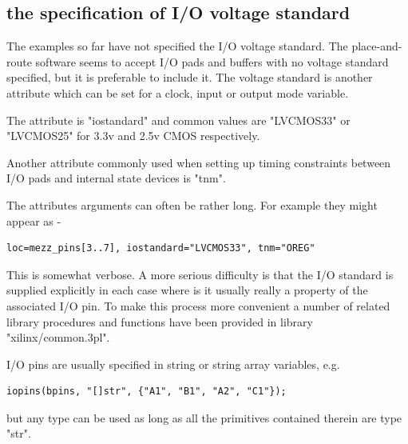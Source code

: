         \subsection{the specification of I/O voltage standard}

            The examples so far have not specified the I/O voltage standard.
            The place-and-route software seems to accept I/O pads and buffers
            with no voltage standard specified, but it is preferable to
            include it. The voltage standard is another attribute which can be set
            for a clock, input or output mode variable.
            
            The attribute is "iostandard" and common values are "LVCMOS33" or
            "LVCMOS25" for 3.3v and 2.5v CMOS respectively.
    
            Another attribute commonly used when setting up timing constraints
            between I/O pads and internal state devices is "tnm".

            The attributes arguments can often be rather long. For example they
            might appear as -
            \begin{lstlisting}[gobble=12, language=threepl]
               loc=mezz_pins[3..7], iostandard="LVCMOS33", tnm="OREG"
            \end{lstlisting}
            This is somewhat verbose. A more serious difficulty is that the I/O
            standard is supplied explicitly in each case where is it usually really
            a property of the associated I/O pin. To make this process more
            convenient a number of related library procedures and functions have
            been provided in library "xilinx/common.3pl".

            I/O pins are usually specified in string or string array variables, e.g.
            \begin{lstlisting}[gobble=12, language=threepl]
               iopins(bpins, "[]str", {"A1", "B1", "A2", "C1"});
            \end{lstlisting}
            but any type can be used as long as all the primitives contained
            therein are type "str".
            
